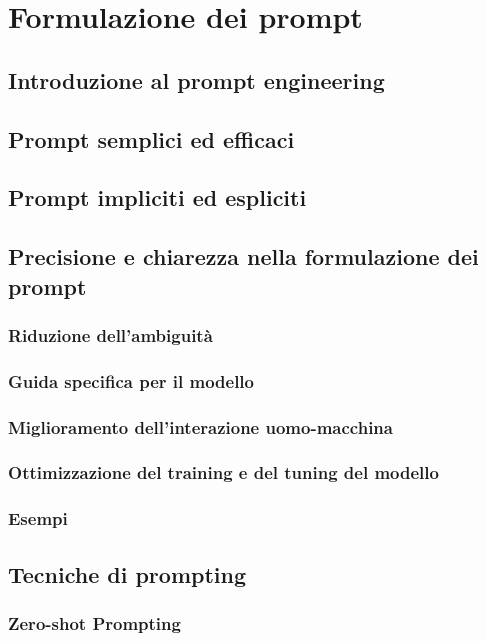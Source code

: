 \section{Formulazione dei prompt}
    \subsection{Introduzione al prompt engineering}
    \subsection{Prompt semplici ed efficaci}
    \subsection{Prompt impliciti ed espliciti}
        
    \subsection{Precisione e chiarezza nella formulazione dei prompt}
        \subsubsection{Riduzione dell’ambiguità}
        \subsubsection{Guida specifica per il modello}
        \subsubsection{Miglioramento dell’interazione uomo-macchina}
        \subsubsection{Ottimizzazione del training e del tuning del modello}
        \subsubsection{Esempi}
    \subsection{Tecniche di prompting}
        \subsubsection{Zero-shot Prompting}
